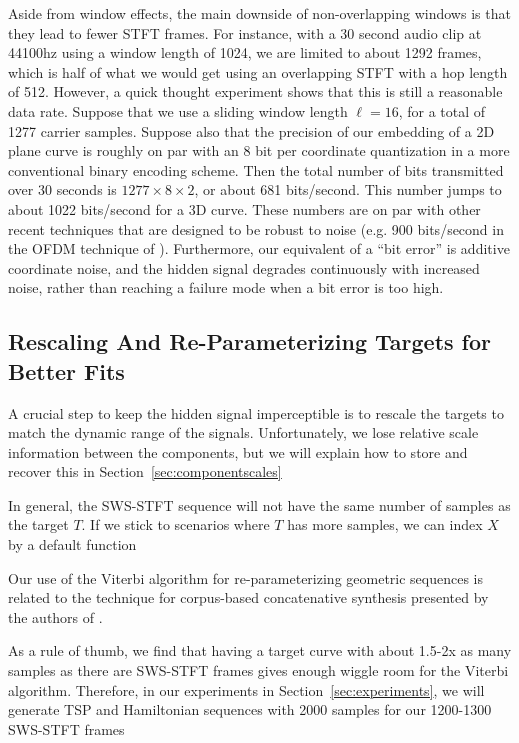 \documentclass[runningheads]{llncs}
\begin{document}
Aside from window effects, the main downside of non-overlapping windows is that they lead to fewer STFT frames.  For instance, with a 30 second audio clip at 44100hz using a window length of 1024, we are limited to about 1292 frames, which is half of what we would get using an overlapping STFT with a hop length of 512.  However, a quick thought experiment shows that this is still a reasonable data rate.  Suppose that we use a sliding window length $\ell=16$, for a total of 1277 carrier samples.  Suppose also that the precision of our embedding of a 2D plane curve is roughly on par with an 8 bit per coordinate quantization in a more conventional binary encoding scheme.  Then the total number of bits transmitted over 30 seconds is $1277 \times 8 \times 2$, or about 681 bits/second.  This number jumps to about 1022 bits/second for a 3D curve.  These numbers are on par with other recent techniques that are designed to be robust to noise (e.g. 900 bits/second in the OFDM technique of \cite{eichelberger_receiving_2019}).  Furthermore, our equivalent of a ``bit error'' is additive coordinate noise, and the hidden signal degrades continuously with increased noise, rather than reaching a failure mode when a bit error is too high.




\subsection{Rescaling And Re-Parameterizing Targets for Better Fits}
\label{sec:reparam}


A crucial step to keep the hidden signal imperceptible is to rescale the targets to match the dynamic range of the signals.  Unfortunately, we lose relative scale information between the components, but we will explain how to store and recover this in Section~\ref{sec:componentscales}


In general, the SWS-STFT sequence will not have the same number of samples as the target $T$.  If we stick to scenarios where $T$ has more samples, we can index $X$ by a default function 



Our use of the Viterbi algorithm for re-parameterizing geometric sequences is related to the technique for corpus-based concatenative synthesis presented by the authors of \cite{schwarz2007corpus}.


As a rule of thumb, we find that having a target curve with about 1.5-2x as many samples as there are SWS-STFT frames gives enough wiggle room for the Viterbi algorithm.  Therefore, in our experiments in Section~\ref{sec:experiments}, we will generate TSP and Hamiltonian sequences with 2000 samples for our 1200-1300 SWS-STFT frames
\end{document}

